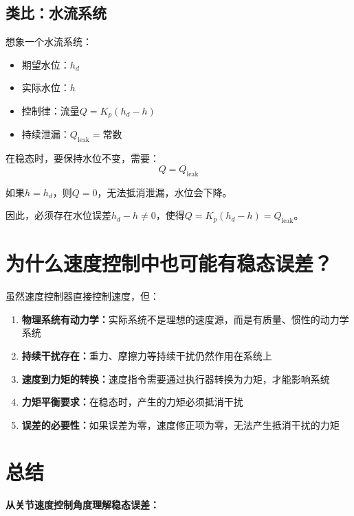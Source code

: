 \documentclass[12pt,a4paper]{article}
\begin{document}
\subsection{类比：水流系统}

想象一个水流系统：
\begin{itemize}
\item 期望水位：$h_d$
\item 实际水位：$h$
\item 控制律：流量$Q = K_p(h_d - h)$
\item 持续泄漏：$Q_{\text{leak}} = \text{常数}$
\end{itemize}

在稳态时，要保持水位不变，需要：
\begin{equation}
Q = Q_{\text{leak}}
\end{equation}

如果$h = h_d$，则$Q = 0$，无法抵消泄漏，水位会下降。

因此，必须存在水位误差$h_d - h \neq 0$，使得$Q = K_p(h_d - h) = Q_{\text{leak}}$。

\section{为什么速度控制中也可能有稳态误差？}

虽然速度控制器直接控制速度，但：

\begin{enumerate}
\item \textbf{物理系统有动力学：}实际系统不是理想的速度源，而是有质量、惯性的动力学系统
\item \textbf{持续干扰存在：}重力、摩擦力等持续干扰仍然作用在系统上
\item \textbf{速度到力矩的转换：}速度指令需要通过执行器转换为力矩，才能影响系统
\item \textbf{力矩平衡要求：}在稳态时，产生的力矩必须抵消干扰
\item \textbf{误差的必要性：}如果误差为零，速度修正项为零，无法产生抵消干扰的力矩
\end{enumerate}

\section{总结}

\textbf{从关节速度控制角度理解稳态误差：}
\end{document}
